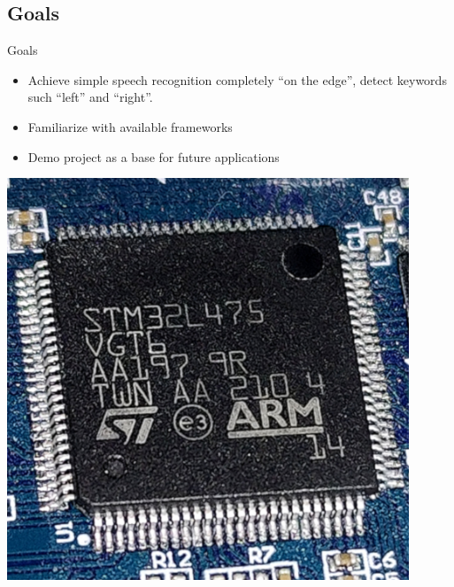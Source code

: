 \documentclass{beamer}
\begin{document}
\subsection{Goals}
\begin{frame}{Goals}
	\begin{minipage}{0.67\textwidth}
	\begin{itemize}
		\setlength\itemsep{1em}
		\item<2->Achieve simple speech recognition completely ``on the edge'',
			detect keywords such ``left'' and ``right''.
		\item<3->Familiarize with available frameworks
		\item<4->Demo project as a base for future applications
	\end{itemize}
	\end{minipage}
	\begin{minipage}{0.24\textwidth}
		\includegraphics[width=0.9\textwidth]{figures/stm32l475.jpg}
	\end{minipage}
\end{frame}
\end{document}
